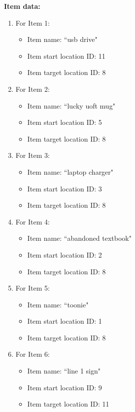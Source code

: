 \documentclass[11pt]{article}
\begin{document}
\textbf{Item data:}
\begin{enumerate}
    \item For Item 1:
    \begin{itemize}
    \item Item name: ``usb drive"
    \item Item start location ID: 11
    \item Item target location ID: 8
    \end{itemize}
        \item For Item 2:
    \begin{itemize}
    \item Item name: ``lucky uoft mug"
    \item Item start location ID: 5
    \item Item target location ID: 8
    \end{itemize}
        \item For Item 3:
    \begin{itemize}
    \item Item name: ``laptop charger"
    \item Item start location ID: 3
    \item Item target location ID: 8
    \end{itemize}
    \item For Item 4:
        \begin{itemize}
    \item Item name: ``abandoned textbook"
    \item Item start location ID: 2
    \item Item target location ID: 8
    \end{itemize}
     \item For Item 5:
    \begin{itemize}
    \item Item name: ``toonie"
    \item Item start location ID: 1
    \item Item target location ID: 8
    \end{itemize}
     \item For Item 6:
    \begin{itemize}
    \item Item name: ``line 1 sign"
    \item Item start location ID: 9
    \item Item target location ID: 11\\
    \end{itemize}
\end{enumerate}
\end{document}
